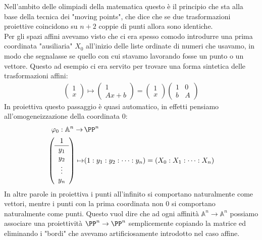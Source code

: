\documentclass[11pt]{scrartcl}
\renewcommand{\AA}{\mathbb{A}}
\begin{document}
   	 Nell'ambito delle olimpiadi della matematica questo è il principio che sta alla base della tecnica dei "moving points", che dice che se due trasformazioni proiettive coincidono su $n+2$ coppie di punti allora sono identiche. \\
   	 Per gli spazi affini avevamo visto che ci era spesso comodo introdurre una prima coordinata "ausiliaria" $X_0$ all'inizio delle liste ordinate di numeri che usavamo, in modo che segnalasse se quello con cui stavamo lavorando fosse un punto o un vettore. Questo ad esempio ci era servito per trovare una forma sintetica delle trasformazioni affini:
   	 \begin{align*}
   	 	\left(\begin{array}{c}
   	 		1 \\
   	 		\hline
   	 		x
   	 	\end{array}\right)\mapsto 
   	 	\left(
   	 	\begin{array}{c}
   	 		1 \\
   	 		\hline
   	 		Ax+b
   	 	\end{array}\right)=\left(\begin{array}{c}
   	 	1 \\
   	 	\hline
   	 	x
   	 	\end{array}\right)\left(
   	 	\begin{array}{c|c}
   	 		1 & 0 \\
   	 		\hline
   	 		b & A
   	 	\end{array}
   	 	\right)
   	 \end{align*}
   	 $$$$
   	 In proiettiva questo passaggio è quasi automatico, in effetti pensiamo all'omogeneizzazione della coordinata $0$:
   	 \begin{align*}
   	 	\varphi_0:\AA^n\to \,&\PP^n \\
   	 	\left(\begin{array}{c}
   	 		1 \\
   	 		\hline 
   	 		y_1 \\
   	 		y_2 \\
   	 		\vdots \\
   	 		y_n
   	 	\end{array}\right) \mapsto & (1:y_1:y_2:\dots:y_n)=(X_0:X_1:\dots:X_n)
   	 \end{align*}
   	 In altre parole in proiettiva i punti all'infinito si comportano naturalmente come vettori, mentre i punti con la prima coordinata non $0$ si comportano naturalmente come punti. Questo vuol dire che ad ogni affinità $\AA^n\to\AA^n$ possiamo associare una proiettività $\PP^n\to\PP^n$ semplicemente copiando la matrice ed eliminando i "bordi" che avevamo artificiosamente introdotto nel caso affine.
\end{document}
